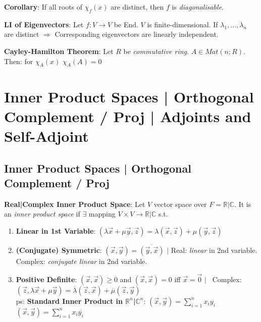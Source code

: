 \documentclass[9pt]{article}
\begin{document}
\quad \textbf{Corollary}: If all roots of $\chi_f(x)$ are distinct, then $f$ is \textit{diagonalisable}.

\textbf{LI of Eigenvectors}: {\footnotesize Let $f:V\to V$ be End. $V$ is finite-dimensional. \quad If $\lambda_1,...,\lambda_n$ are distinct $\Rightarrow$ Corresponding eigenvectors are linearly independent.}

\textbf{Cayley-Hamilton Theorem}: Let $R$ be \textit{commutative ring}. $A\in Mat(n;R)$. \quad Then: for $\chi_A(x)$ \quad $\chi_A(A)=0$


\section{Inner Product Spaces | Orthogonal Complement / Proj | Adjoints and Self-Adjoint} %

\subsection{Inner Product Spaces | Orthogonal Complement / Proj} %

\textbf{Real|Complex Inner Product Space}: Let $V$ vector space over $F=\mathbb{R}| \mathbb{C}$. It is an \textit{inner product space} if $\exists$ mapping $V\times V\to \mathbb{R}| \mathbb{C}$ s.t.

\begin{enumerate}[itemsep=-2pt, topsep=-2pt]
    \item \textbf{Linear in 1st Variable}: $(\lambda \vec{x} + \mu \vec{y},\vec{z})=\lambda(\vec{x},\vec{z})+\mu(\vec{y},\vec{z})$ 
    \item \textbf{(Conjugate) Symmetric}: $(\vec{x},\vec{y})=\overline{(\vec{y},\vec{x})}$  \quad $\big|$ {\footnotesize Real: \textit{linear} in 2nd variable. \qquad Complex: \textit{conjugate linear} in 2nd variable.}
    \item \textbf{Positive Definite}: $(\vec{x},\vec{x})\ge0$ and $(\vec{x},\vec{x})=0$ iff $\vec{x}=\vec{0}$ \qquad \quad \quad $\big|$ \qquad \qquad \qquad \qquad \qquad \quad \ {\footnotesize Complex: $(\vec{z},\lambda \vec{x} + \mu \vec{y})=\overline{\lambda}(\vec{z},\vec{x})+\overline{\mu}(\vec{z},\vec{y})$} \\
    ps: \textbf{Standard Inner Product in $\mathbb{R}^n$|$\mathbb{C}^n$}: $(\vec{x},\vec{y})=\sum_{i=1}^n x_iy_i$ \quad $(\vec{x},\vec{y})=\sum_{i=1}^n x_i\overline{y_i}$ 
\end{enumerate}
\end{document}
